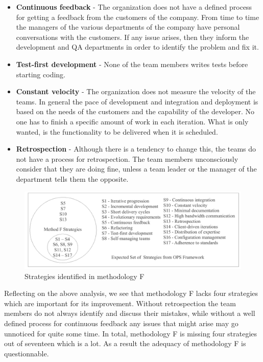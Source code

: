 \begin{itemize}
\item \textbf{Continuous feedback} - The organization does not have a defined process for getting a feedback from the customers of the company. From time to time the managers of the various departments of the company have personal conversations with the customers. If any issue arises, then they inform the development and QA departments in order to identify the problem and fix it.
\item \textbf{Test-first development} - None of the team members writes tests before starting coding.
\item \textbf{Constant velocity} - The organization does not measure the velocity of the teams. In general the pace of development and integration and deployment is based on the needs of the customers and the capability of the developer. No one has to finish a specific amount of work in each iteration. What is only wanted, is the functionality to be delivered when it is scheduled.
\item \textbf{Retrospection} - Although there is a tendency to change this, the teams do not have a process for retrospection. The team members unconsciously consider that they are doing fine, unless a team leader or the manager of the department tells them the opposite.
\end{itemize}

\begin{figure}[H]
\centerline{\includegraphics[scale=0.9]{include/case_study/fig/companyF_strategies.pdf}}
\caption{Strategies identified in methodology F} 
\label{fig:companyF_strategies}
\end{figure}

Reflecting on the above analysis, we see that methodology F lacks four strategies which are important for its improvement. Without retrospection the team members do not always identify and discuss their mistakes, while without a well defined process for continuous feedback any issues that might arise may go unnoticed for quite some time. In total, methodology F is missing four strategies out of seventeen which is a lot. As a result the adequacy of methodology F is questionnable.

